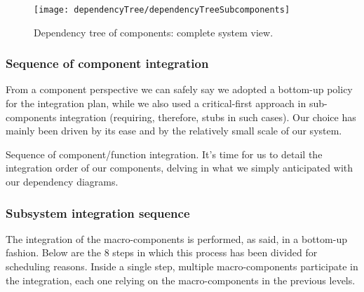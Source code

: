 	\vfill
	
	\begin{figure}[H]
		\centering
		\texttt{[image: dependencyTree/dependencyTreeSubcomponents]}
		\caption{Dependency tree of components: complete system view.}
		\label{DependencyTreeComplete}
	\end{figure}

\subsubsection{Sequence of component integration}
	From a component perspective we can safely say we adopted a bottom-up policy for the integration plan, while we also used a critical-first approach in sub-components integration (requiring, therefore, stubs in such cases). 
	Our choice has mainly been driven by its ease and by the relatively small scale of our system.
	
	Sequence of component/function integration.
	It's time for us to detail the integration order of our components, delving in what we simply anticipated with our dependency diagrams.
	
	

\vfill
\subsubsection{Subsystem integration sequence}
	The integration of the macro-components is performed, as said, in a bottom-up fashion. Below are the 8 steps in which this process has been divided for scheduling reasons.
	Inside a single step, multiple macro-components participate in the integration, each one relying on the macro-components in the previous levels.
	
